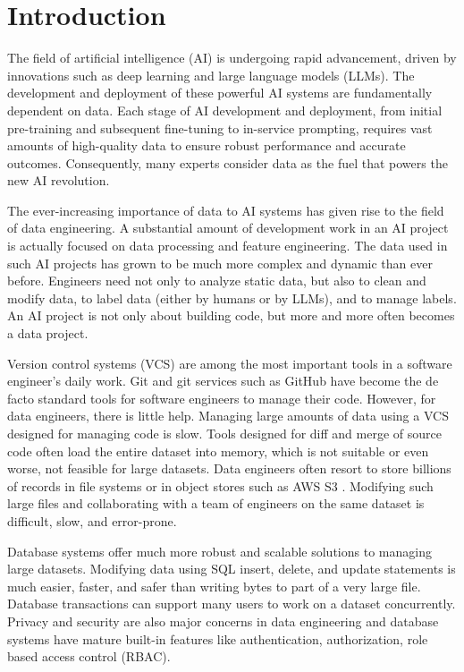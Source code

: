 \documentclass[sigconf,nonacm]{acmart} %
\begin{document}
\maketitle

\section{Introduction}\label{sec:intro}

The field of artificial intelligence (AI) is undergoing rapid advancement, driven 
by innovations such as deep learning and large language models (LLMs). 
The development and deployment of these powerful AI systems are fundamentally 
dependent on data.  Each stage of AI development and deployment, from  
initial pre-training and subsequent fine-tuning to in-service prompting, requires 
vast amounts of high-quality data to ensure robust performance and accurate outcomes. 
Consequently, many experts consider data as the fuel that powers the new AI revolution.

The ever-increasing importance of data to AI systems has given rise to the field of 
data engineering.  A substantial amount of development work in an AI project
is actually focused on data processing and feature engineering.  The data used in 
such AI projects has grown to be much more complex and dynamic than ever before.
Engineers need not only to analyze static data, but also to clean and modify data, 
to label data (either by humans or by LLMs), and to manage labels.  An AI project 
is not only about building code, but more and more often becomes a data project.

Version control systems (VCS) are among the most important tools in a software 
engineer's daily work.  
Git \cite{Git} and git services such as GitHub \cite{GitHub} have
become the de facto standard tools for software engineers to manage their code.  
However, for data engineers, there is little help.  Managing large amounts of 
data using a VCS designed for managing code is slow. Tools designed for 
diff and merge of source code often load the entire dataset into memory, which 
is not suitable or even worse, not feasible for large datasets.  
Data engineers often resort to store billions of records in file systems or in 
object stores such as AWS S3 \cite{S3}.  Modifying such large files and collaborating
with a team of engineers on the same dataset is difficult, slow, and error-prone.

Database systems offer much more robust and scalable solutions to managing 
large datasets.  Modifying data using SQL insert, delete, and update statements is 
much easier, faster, and safer than writing bytes to part of a very large file.  
Database transactions can support many users to work on a dataset concurrently.  
Privacy and security are also major concerns in data engineering and database 
systems have mature built-in features like authentication, authorization, role 
based access control (RBAC). 
\end{document}
